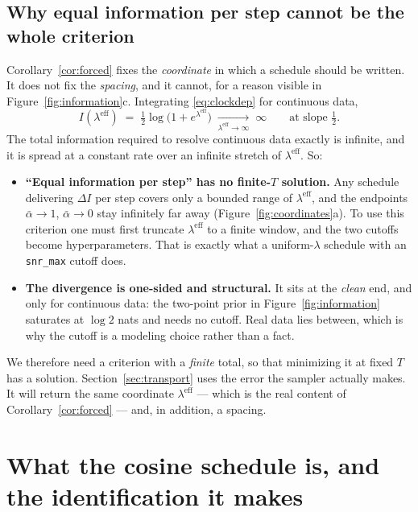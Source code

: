 \documentclass[11pt]{article}
\theoremstyle{definition}
\newcommand{\abar}{\bar\alpha}
\newcommand{\leff}{\lambda^{\mathrm{eff}}}
\begin{document}
\subsection{Why equal information per step cannot be the whole criterion}

Corollary~\ref{cor:forced} fixes the \emph{coordinate} in which a schedule
should be written. It does not fix the \emph{spacing}, and it cannot, for a
reason visible in Figure~\ref{fig:information}c. Integrating
\eqref{eq:clockdep} for continuous data,
\begin{equation}
  I(\leff) \;=\; \tfrac12\log\big(1+e^{\leff}\big)
  \;\xrightarrow[\leff\to\infty]{}\;\infty
  \qquad\text{at slope }\tfrac12 .
  \label{eq:divergence}
\end{equation}
The total information required to resolve continuous data exactly is infinite,
and it is spread at a constant rate over an infinite stretch of $\leff$. So:

\begin{itemize}\itemsep2pt
  \item \textbf{``Equal information per step'' has no finite-$T$ solution.} Any
  schedule delivering $\Delta I$ per step covers only a bounded range of $\leff$,
  and the endpoints $\abar\to1$, $\abar\to0$ stay infinitely far away
  (Figure~\ref{fig:coordinates}a). To use this criterion one must first truncate
  $\leff$ to a finite window, and the two cutoffs become hyperparameters. That is
  exactly what a uniform-$\lambda$ schedule with an \texttt{snr\_max} cutoff
  does.
  \item \textbf{The divergence is one-sided and structural.} It sits at the
  \emph{clean} end, and only for continuous data: the two-point prior in
  Figure~\ref{fig:information} saturates at $\log2$ nats and needs no cutoff.
  Real data lies between, which is why the cutoff is a modeling choice rather
  than a fact.
\end{itemize}

We therefore need a criterion with a \emph{finite} total, so that minimizing it
at fixed $T$ has a solution. Section~\ref{sec:transport} uses the error the
sampler actually makes. It will return the same coordinate $\leff$ --- which is
the real content of Corollary~\ref{cor:forced} --- and, in addition, a spacing.

\section{What the cosine schedule is, and the identification it makes}
\label{sec:cosine}
\end{document}
